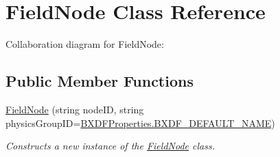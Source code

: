 \hypertarget{class_field_node}{}\section{Field\+Node Class Reference}
\label{class_field_node}


Collaboration diagram for Field\+Node\+:
\subsection*{Public Member Functions}
\begin{DoxyCompactItemize}
\item 
\hyperlink{class_field_node_a9c1ee44a247358c06f9df5c91dbcb1e4}{Field\+Node} (string node\+ID, string physics\+Group\+ID=\hyperlink{class_b_x_d_f_properties_a528bb431080585f72f9f74bd44a23932}{B\+X\+D\+F\+Properties.\+B\+X\+D\+F\+\_\+\+D\+E\+F\+A\+U\+L\+T\+\_\+\+N\+A\+ME})
\begin{DoxyCompactList}\small\item\em Constructs a new instance of the \hyperlink{class_field_node}{Field\+Node} class. \end{DoxyCompactList}\end{DoxyCompactItemize}
